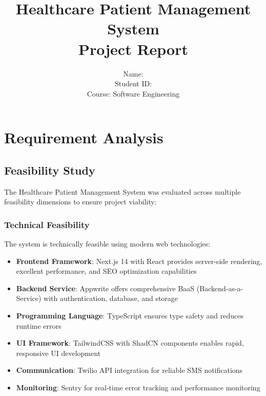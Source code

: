 \documentclass[11pt,a4paper]{article}
\title{\textbf{Healthcare Patient Management System\\Project Report}}
\author{Name:\\Student ID: \\Course: Software Engineering}
\begin{document}
\maketitle
\thispagestyle{empty}
\newpage

\tableofcontents
\newpage

\section{Requirement Analysis}

\subsection{Feasibility Study}

The Healthcare Patient Management System was evaluated across multiple feasibility dimensions to ensure project viability:

\subsubsection{Technical Feasibility}
The system is technically feasible using modern web technologies:
\begin{itemize}
    \item \textbf{Frontend Framework}: Next.js 14 with React provides server-side rendering, excellent performance, and SEO optimization capabilities
    \item \textbf{Backend Service}: Appwrite offers comprehensive BaaS (Backend-as-a-Service) with authentication, database, and storage
    \item \textbf{Programming Language}: TypeScript ensures type safety and reduces runtime errors
    \item \textbf{UI Framework}: TailwindCSS with ShadCN components enables rapid, responsive UI development
    \item \textbf{Communication}: Twilio API integration for reliable SMS notifications
    \item \textbf{Monitoring}: Sentry for real-time error tracking and performance monitoring
\end{itemize}
\end{document}
